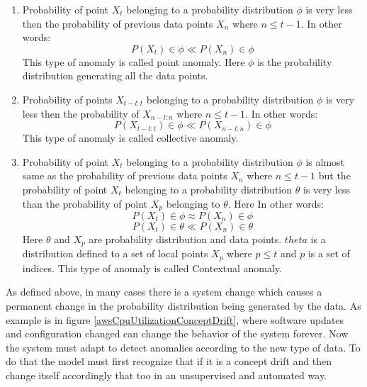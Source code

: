 \documentclass[12pt]{article}
\begin{document}
\begin{enumerate}
    \item Probability of point $X_t$ belonging to a probability distribution $\phi$ is very less then the probability of previous data points $X_n$ where $n \leq t-1$. In other words:\\
    \begin{equation}
        P(X_t) \in \phi  \ll P(X_n) \in \phi 
    \end{equation}
    This type of anomaly is called point anomaly. Here $\phi$ is the probability distribution generating all the data points.
    \item Probability of points $X_{t-l:t}$ belonging to a probability distribution $\phi$ is very less then the probability of $X_{n-l:n}$ where $n \leq t-1$. In other words: \\
    \begin{equation}
        P(X_{t-l:t}) \in \phi  \ll P(X_{n-l:n}) \in \phi         
    \end{equation}
        This type of anomaly is called collective anomaly.
    \item Probability of point $X_t$ belonging to a probability distribution $\phi$ is almost same as the probability of previous data points $X_n$ where $n \leq t-1$ but the probability of point $X_t$ belonging to a probability distribution $\theta$ is very less than the probability of point $X_p$ belonging to $\theta$. Here In other words:\\
    \begin{equation}
        P(X_t) \in \phi  \approx P(X_n) \in \phi 
    \end{equation}
    \begin{equation}
        P(X_t) \in \theta  \ll P(X_n) \in \theta 
    \end{equation}
    Here $\theta$ and  $X_p$ are probability distribution and data points. $theta$ is a distribution defined to a set of local points $X_p$ where $p \leq t$ and $p$ is a set of indices. 
    This type of anomaly is called Contextual anomaly. 
\end{enumerate}
As defined above, in many cases there is a system change which causes a permanent change in the probability distribution being generated by the data. As example is in figure \ref{awsCpuUtilizationConceptDrift}, where software updates and configuration changed can change the behavior of the system forever. Now the system must adapt to detect anomalies according to the new type of data. To do that the model must first recognize that if it is a concept drift and then change itself accordingly that too in an unsupervised and automated way.
\end{document}
